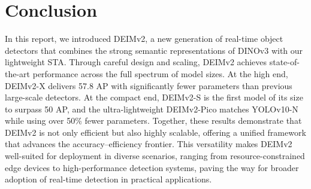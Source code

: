 \section{Conclusion}

In this report, we introduced DEIMv2, a new generation of real-time object detectors that combines the strong semantic representations of DINOv3 with our lightweight STA. Through careful design and scaling, DEIMv2 achieves state-of-the-art performance across the full spectrum of model sizes. At the high end, DEIMv2-X delivers 57.8 AP with significantly fewer parameters than previous large-scale detectors. At the compact end, DEIMv2-S is the first model of its size to surpass 50 AP, and the ultra-lightweight DEIMv2-Pico matches YOLOv10-N while using over 50\% fewer parameters. Together, these results demonstrate that DEIMv2 is not only efficient but also highly scalable, offering a unified framework that advances the accuracy–efficiency frontier. This versatility makes DEIMv2 well-suited for deployment in diverse scenarios, ranging from resource-constrained edge devices to high-performance detection systems, paving the way for broader adoption of real-time detection in practical applications.
